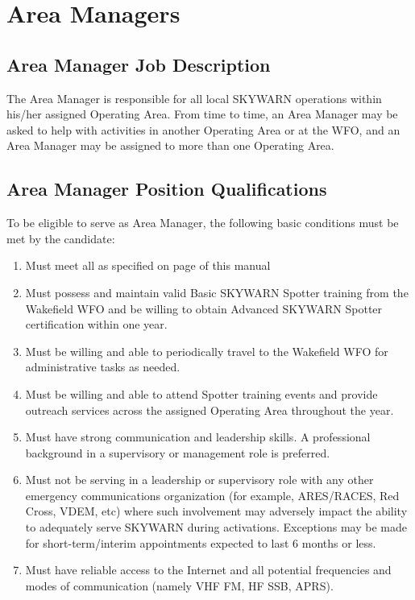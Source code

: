 \documentclass[pdflatex,letterpaper,twoside,12pt]{book}
\begin{document}

\section{Area Managers}

\subsection{Area Manager Job Description}\label{am-jobdesc}

The Area Manager is responsible for all local SKYWARN operations within his/her assigned Operating Area.  From time to time, an Area Manager may be asked to help with activities in another Operating Area or at the WFO, and an Area Manager may be assigned to more than one Operating Area. 

\subsection{Area Manager Position Qualifications}

To be eligible to serve as Area Manager, the following basic conditions must be met by the candidate:

\begin{enumerate}
\item Must meet all  as specified on page \pageref{nco-criteria} of this manual
\item Must possess and maintain valid Basic SKYWARN Spotter training from the Wakefield WFO and be willing to obtain Advanced SKYWARN Spotter certification within one year.
\item Must be willing and able to periodically travel to the Wakefield WFO for administrative tasks as needed.
\item Must be willing and able to attend Spotter training events and provide outreach services across the assigned Operating Area throughout the year.
\item Must have strong communication and leadership skills.  A professional background in a supervisory or management role is preferred.
\item Must not be serving in a leadership or supervisory role with any other emergency communications organization (for example, ARES/RACES, Red Cross, VDEM, etc) where such involvement may adversely impact the ability to adequately serve SKYWARN during activations.  Exceptions may be made for short-term/interim appointments expected to last 6 months or less.
\item Must have reliable access to the Internet and all potential frequencies and modes of communication (namely VHF FM, HF SSB, APRS).
\end{enumerate}
\end{document}

